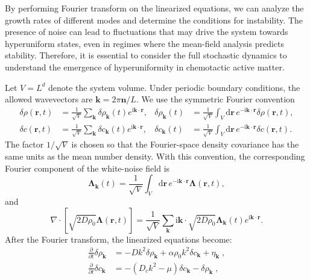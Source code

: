 \documentclass{article}
\begin{document}
By performing Fourier transform on the linearized equations, we can analyze the growth rates of different modes and determine the conditions for instability. The presence of noise can lead to fluctuations that may drive the system towards hyperuniform states, even in regimes where the mean-field analysis predicts stability. Therefore, it is essential to consider the full stochastic dynamics to understand the emergence of hyperuniformity in chemotactic active matter.

Let $V=L^d$ denote the system volume. Under periodic boundary conditions, the allowed wavevectors are $\mathbf{k}=2\pi\mathbf{n}/L$. We use the symmetric Fourier convention
\begin{subequations}
    \begin{align}
        \delta\rho(\mathbf r,t)&=\frac{1}{\sqrt V}\sum_{\mathbf k}\delta\rho_{\mathbf k}(t)e^{\mathrm{i}\mathbf k\cdot\mathbf r},
        &\delta\rho_{\mathbf k}(t)&=\frac{1}{\sqrt V}\int_V \mathrm d\mathbf r\,e^{-\mathrm{i}\mathbf k\cdot\mathbf r}\delta\rho(\mathbf r,t),\\
        \delta c(\mathbf r,t)&=\frac{1}{\sqrt V}\sum_{\mathbf k}\delta c_{\mathbf k}(t)e^{\mathrm{i}\mathbf k\cdot\mathbf r},
        &\delta c_{\mathbf k}(t)&=\frac{1}{\sqrt V}\int_V \mathrm d\mathbf r\,e^{-\mathrm{i}\mathbf k\cdot\mathbf r}\delta c(\mathbf r,t).
    \end{align}
    \label{eq:FourierConvention}
\end{subequations}
The factor $1/\sqrt V$ is chosen so that the Fourier-space density covariance has the same units as the mean number density. With this convention, the corresponding Fourier component of the white-noise field is
\begin{equation}
    \boldsymbol{\Lambda}_{\mathbf k}(t)=\frac{1}{\sqrt V}\int_V\mathrm d\mathbf r\,
    e^{-\mathrm{i}\mathbf k\cdot\mathbf r}\boldsymbol{\Lambda}(\mathbf r,t),
\end{equation}
and
\begin{equation}
    \nabla\cdot\left[\sqrt{2D\rho_0}\boldsymbol{\Lambda}(\mathbf r,t)\right]
    =\frac{1}{\sqrt V}\sum_{\mathbf k}\mathrm{i}\mathbf k\cdot
    \sqrt{2D\rho_0}\boldsymbol{\Lambda}_{\mathbf k}(t)e^{\mathrm{i}\mathbf k\cdot\mathbf r}.
\end{equation}
After the Fourier transform, the linearized equations become:
\begin{subequations}
    \begin{align}
        \frac{\partial}{\partial t}\delta \rho _{\mathbf{k}}&=-Dk^2\delta \rho _{\mathbf{k}}+\alpha \rho _0k^2\delta c_{\mathbf{k}}+\eta _{\mathbf{k}}\;,\label{eq:FourierLinearizedKSmodel1}\\
        \frac{\partial}{\partial t}\delta c_{\mathbf{k}}&=-(D_ck^2-\mu )\delta c_{\mathbf{k}}-\delta \rho _{\mathbf{k}}\;,
    \end{align}
    \label{eq:FourierLinearizedKSmodel}
\end{subequations}
\end{document}
